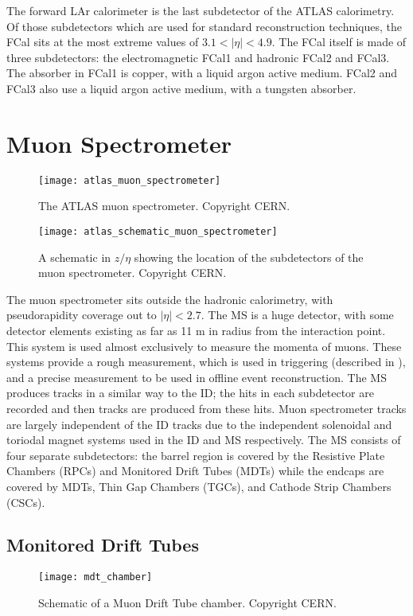 The forward LAr calorimeter is the last subdetector of the ATLAS calorimetry.
Of those subdetectors which are used for standard reconstruction techniques, the FCal sits at the most extreme values of $ 3.1 < |\eta| < 4.9$.
The FCal itself is made of three subdetectors: the electromagnetic FCal1 and hadronic FCal2 and FCal3.
The absorber in FCal1 is copper, with a liquid argon active medium.
FCal2 and FCal3 also use a liquid argon active medium, with a tungsten absorber.

\section{Muon Spectrometer}
\begin{figure}
\caption{The ATLAS muon spectrometer. Copyright CERN.} \label{fig:atlas_muon_spectrometer}
\texttt{[image: atlas\_muon\_spectrometer]}
\end{figure}

\begin{figure}
\caption{A schematic in $z/\eta$ showing the location of the subdetectors of the muon spectrometer. Copyright CERN.} \label{fig:atlas_schematic_muon_spectrometer}
\texttt{[image: atlas\_schematic\_muon\_spectrometer]}
\end{figure}

The muon spectrometer sits outside the hadronic calorimetry, with pseudorapidity coverage out to $|\eta| < 2.7$.
The MS is a huge detector, with some detector elements existing as far as 11 m in radius from the interaction point.
This system is used almost exclusively to measure the momenta of muons.
These systems provide a rough measurement, which is used in triggering (described in ), and a precise measurement to be used in offline event reconstruction.
The MS produces tracks in a similar way to the ID; the hits in each subdetector are recorded and then tracks are produced from these hits.
Muon spectrometer tracks are largely independent of the ID tracks due to the independent solenoidal and toriodal magnet systems used in the ID and MS respectively.
The MS consists of four separate subdetectors: the barrel region is covered by the Resistive Plate Chambers (RPCs) and Monitored Drift Tubes (MDTs) while the endcaps are covered by MDTs, Thin Gap Chambers (TGCs), and Cathode Strip Chambers (CSCs).

\subsection{Monitored Drift Tubes}
\begin{figure}
\caption{Schematic of a Muon Drift Tube chamber. Copyright CERN.} \label{fig:mdt_chamber}
\texttt{[image: mdt\_chamber]}
\end{figure}

